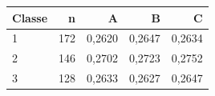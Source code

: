 \begin{tabular}{lrrrr}
\toprule
Classe & n & A & B & C \\
\midrule
1 & 172 & 0,2620 & 0,2647 & 0,2634 \\
2 & 146 & 0,2702 & 0,2723 & 0,2752 \\
3 & 128 & 0,2633 & 0,2627 & 0,2647 \\
\bottomrule
\end{tabular}
